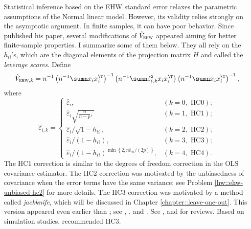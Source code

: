 Statistical inference based on the EHW standard error relaxes the parametric assumptions of the Normal linear model. However, its validity relies strongly on the asymptotic argument. In finite samples, it can have poor behavior. 
Since \citet{white::1980} published his paper, several modifications of $\hat{V}_{\textsc{ehw}}$ appeared aiming for better finite-sample properties. I summarize some of them below. They all rely on the $h_{ii}$'s, which are the diagonal elements of the projection matrix $H$ and called the {\it leverage scores}. Define
\[
\hat{V}_{\textsc{ehw},k} = n^{-1}\left(n^{-1}\sumn x_{i}x_{i}^{\T}\right)^{-1}\left(n^{-1}\sumn\hat{\varepsilon}_{i,k}^{2}x_{i}x_{i}^{\T}\right)\left(n^{-1}\sumn x_{i}x_{i}^{\T}\right)^{-1},
\]
where  
\[
\hat{\varepsilon}_{i,k}=\begin{cases}
\hat{\varepsilon}_{i}, & (k=0, \text{ HC}0); \\
\hat{\varepsilon}_{i}\sqrt{\frac{n}{n-p},} & (k=1, \text{ HC}1) ; \\
\hat{\varepsilon}_{i}/\sqrt{1-h_{ii}}, & (k=2, \text{ HC}2) ; \\
\hat{\varepsilon}_{i}/(1-h_{ii}), & (k=3, \text{ HC}3); \\
\hat{\varepsilon}_{i}/(1-h_{ii})^{\min\left\{ 2,nh_{ii}/(2p)\right\} }, & (k=4, \text{ HC}4).
\end{cases}
\]
The HC1 correction is similar to the degrees of freedom correction in the OLS covariance estimator. The HC2 correction was motivated by the unbiasedness of covariance when the error terms have the same variance; see Problem \ref{hw::ehw-unbiased-hc2} for more details. The HC3 correction was motivated by a method called {\it jackknife}, which will be discussed in Chapter \ref{chapter::leave-one-out}. This version appeared even earlier than  \citet{white::1980}; see \citet{miller1974unbalanced}, \citet{hinkley1977jackknifing}, and \citet{reeds1978jackknifing}. 
See \citet{mackinnon1985some}, \citet{long2000using} and \citet{cribari2004asymptotic} for reviews. Based on simulation studies, \citet{long2000using} recommended HC3. 





